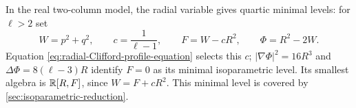 \begin{remark}
\label{sec:three-quadratic-profiles}
In the real two-column model, the radial variable gives quartic minimal levels: for
$\ell>2$ set
\[
 W=p^2+q^2,\qquad c=\frac1{\ell-1},\qquad
 F=W-cR^2,\qquad \Phi=R^2-2W.
\]
Equation \eqref{eq:radial-Clifford-profile-equation} selects this $c$;
$|\nabla\Phi|^2=16R^3$ and $\Delta\Phi=8(\ell-3)R$ identify
$F=0$ as its minimal isoparametric level. Its smallest algebra is
$\mathbb R[R,F]$, since $W=F+cR^2$. This minimal level is covered by
\cref{sec:isoparametric-reduction}.
\end{remark}
